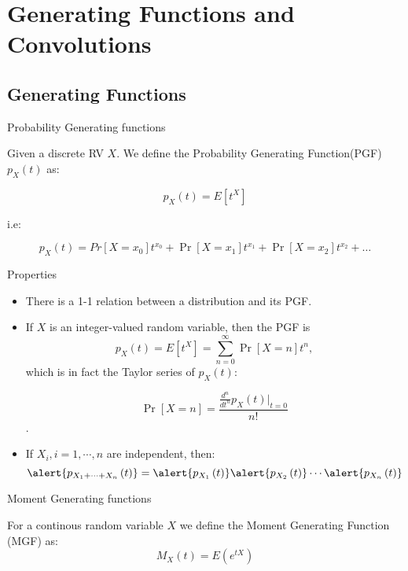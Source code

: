 \documentclass[11pt]{beamer}
\begin{document}
\section{Generating Functions and Convolutions}
\subsection{Generating Functions}
\begin{frame}{Probability Generating functions}
  
\begin{definition}[PGF]
Given a discrete RV $X$. We define the Probability Generating Function(PGF) $p_{X}(t)$ as:

$$p_{X}\left( t\right)=E\left[ t^{X}\right]  $$ 

\end{definition}

i.e:

$$p_{X}\left( t\right)=Pr[X=x_0]t^{x_0}+\Pr[X=x_1] t^{x_1}+ \Pr[X=x_2]  t^{x_2} + \ldots$$

\end{frame}
\begin{frame}{Properties}
  \begin{itemize}

  \item There is a 1-1 relation between a distribution and its PGF.
  \item If $X$ is an integer-valued random variable, then the PGF is
    $$p_{X}\left( t\right)=E\left[ t^{X}\right] =\sum_{n=0}^\infty\Pr[X=n] t^n,$$
    which is in fact the Taylor series of $p_{X}\left( t\right)$:

$$\Pr[X=n]=\frac{\frac{d^n}{dt^n}p_{X}\left( t\right)|_{t=0}}{n!}$$.

  \item If $X_i, i=1,\cdots,n$ are independent, then: $$\alert{p_{X_1+\cdots+X_n}\left( t\right)}=\alert{p_{X_1}\left( t\right)}\alert{p_{X_2}\left( t\right)}\cdots \alert{p_{X_n}\left( t\right)}$$
  \end{itemize}
\end{frame}
\begin{frame}{Moment Generating functions}

\begin{definition}[MGF]

For a continous random variable $X$ we define the Moment Generating Function (MGF) as: 
$$M_{X}\left( t\right)=E\left( e^{tX}\right)$$

\end{definition}

\end{frame}
\end{document}
